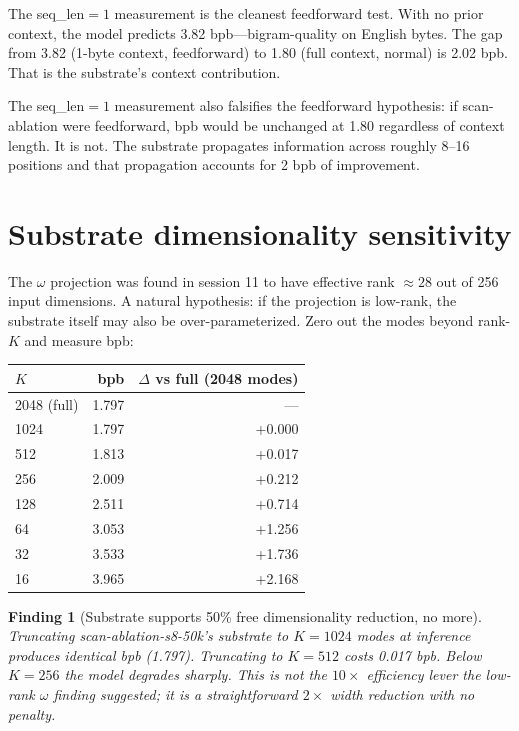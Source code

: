 \documentclass[11pt,openany]{book}
\newtheorem{finding}{Finding}[chapter]
\begin{document}
The seq\_len$=1$ measurement is the cleanest feedforward test. With no
prior context, the model predicts 3.82 bpb---bigram-quality on English
bytes. The gap from 3.82 (1-byte context, feedforward) to 1.80 (full context,
normal) is 2.02 bpb. That is the substrate's context contribution.

The seq\_len$=1$ measurement also falsifies the feedforward hypothesis:
if scan-ablation were feedforward, bpb would be unchanged at 1.80 regardless
of context length. It is not. The substrate propagates information across
roughly 8--16 positions and that propagation accounts for 2 bpb of
improvement.

\section{Substrate dimensionality sensitivity}

The $\omega$ projection was found in session 11 to have effective rank
$\approx 28$ out of 256 input dimensions. A natural hypothesis: if the
projection is low-rank, the substrate itself may also be over-parameterized.
Zero out the modes beyond rank-$K$ and measure bpb:

\begin{longtable}{lrr}
\toprule
$K$ & bpb & $\Delta$ vs full (2048 modes) \\
\midrule
2048 (full) & 1.797 & --- \\
1024        & 1.797 & +0.000 \\
512         & 1.813 & +0.017 \\
256         & 2.009 & +0.212 \\
128         & 2.511 & +0.714 \\
64          & 3.053 & +1.256 \\
32          & 3.533 & +1.736 \\
16          & 3.965 & +2.168 \\
\bottomrule
\end{longtable}

\begin{finding}[Substrate supports 50\% free dimensionality reduction, no more]
Truncating scan-ablation-s8-50k's substrate to $K=1024$ modes at inference
produces identical bpb (1.797). Truncating to $K=512$ costs 0.017 bpb.
Below $K=256$ the model degrades sharply. This is not the $10\times$
efficiency lever the low-rank $\omega$ finding suggested; it is a
straightforward $2\times$ width reduction with no penalty.
\end{finding}
\end{document}
